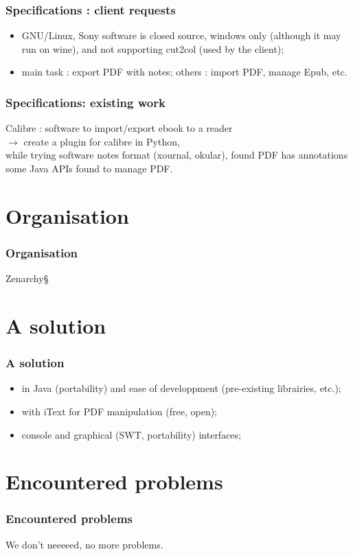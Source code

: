 \documentclass[t,12pt]{beamer}
\begin{document}
\begin{frame}
  \frametitle{Specifications : client requests}
  \begin{itemize}
    \item GNU/Linux,
    \pause Sony software is closed source, windows only (although
    it may run on wine), and not supporting cut2col (used by the
    client);
    \pause \item main task : export PDF with notes; \pause others :
    import PDF, manage Epub, etc.
  \end{itemize}
\end{frame}

\begin{frame}
  \frametitle{Specifications: existing work}
  Calibre : software to import/export ebook to a reader\\
  $\rightarrow$ create a plugin for calibre in Python,\\
  \pause while trying software notes format (xournal, okular),
  found PDF has annotations\\
  \pause some Java APIs found to manage PDF.
\end{frame}

\section{Organisation}
\begin{frame}
  \frametitle{Organisation}
  Zenarchy§
\end{frame}

\section{A solution}
\begin{frame}
  \frametitle{A solution}
  \begin{itemize}
    \item in Java (portability) and ease of developpment (pre-existing
      librairies, etc.);
    \pause \item with iText for PDF manipulation (free, open);
    \pause \item console and graphical (SWT, portability) interfaces;
  \end{itemize}
\end{frame}

\section{Encountered problems}
\begin{frame}
  \frametitle{Encountered problems}
  We don't neeeeed, no more problems.
\end{frame}
\end{document}
